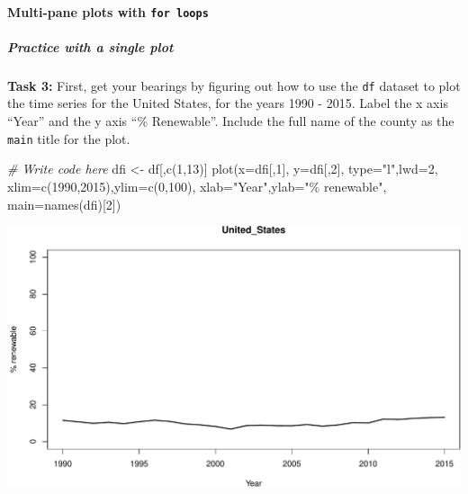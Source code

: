 \documentclass[
]{book}
\newenvironment{Shaded}{\begin{snugshade}}{\end{snugshade}}
\newcommand{\AttributeTok}[1]{\textcolor[rgb]{0.77,0.63,0.00}{#1}}
\newcommand{\CommentTok}[1]{\textcolor[rgb]{0.56,0.35,0.01}{\textit{#1}}}
\newcommand{\DecValTok}[1]{\textcolor[rgb]{0.00,0.00,0.81}{#1}}
\newcommand{\FunctionTok}[1]{\textcolor[rgb]{0.00,0.00,0.00}{#1}}
\newcommand{\NormalTok}[1]{#1}
\newcommand{\OtherTok}[1]{\textcolor[rgb]{0.56,0.35,0.01}{#1}}
\newcommand{\StringTok}[1]{\textcolor[rgb]{0.31,0.60,0.02}{#1}}
\begin{document}
\hypertarget{multi-pane-plots-with-for-loops}{%
\paragraph*{\texorpdfstring{Multi-pane plots with \texttt{for\ loops}}{Multi-pane plots with for loops}}\label{multi-pane-plots-with-for-loops}}

\hypertarget{practice-with-a-single-plot}{%
\subparagraph*{Practice with a single plot}\label{practice-with-a-single-plot}}

\textbf{Task 3:} First, get your bearings by figuring out how to use the \texttt{df} dataset to plot the time series for the United States, for the years 1990 - 2015. Label the x axis ``Year'' and the y axis ``\% Renewable''. Include the full name of the county as the \texttt{main} title for the plot.

\begin{Shaded}
\begin{Highlighting}[]
\CommentTok{\# Write code here}
\NormalTok{dfi }\OtherTok{\textless{}{-}}\NormalTok{ df[,}\FunctionTok{c}\NormalTok{(}\DecValTok{1}\NormalTok{,}\DecValTok{13}\NormalTok{)] }
\FunctionTok{plot}\NormalTok{(}\AttributeTok{x=}\NormalTok{dfi[,}\DecValTok{1}\NormalTok{],}
     \AttributeTok{y=}\NormalTok{dfi[,}\DecValTok{2}\NormalTok{],}
     \AttributeTok{type=}\StringTok{"l"}\NormalTok{,}\AttributeTok{lwd=}\DecValTok{2}\NormalTok{,}
     \AttributeTok{xlim=}\FunctionTok{c}\NormalTok{(}\DecValTok{1990}\NormalTok{,}\DecValTok{2015}\NormalTok{),}\AttributeTok{ylim=}\FunctionTok{c}\NormalTok{(}\DecValTok{0}\NormalTok{,}\DecValTok{100}\NormalTok{),}
     \AttributeTok{xlab=}\StringTok{"Year"}\NormalTok{,}\AttributeTok{ylab=}\StringTok{"\% renewable"}\NormalTok{,}
     \AttributeTok{main=}\FunctionTok{names}\NormalTok{(dfi)[}\DecValTok{2}\NormalTok{])}
\end{Highlighting}
\end{Shaded}

\includegraphics{figures/unnamed-chunk-325-1.pdf}
\end{document}
